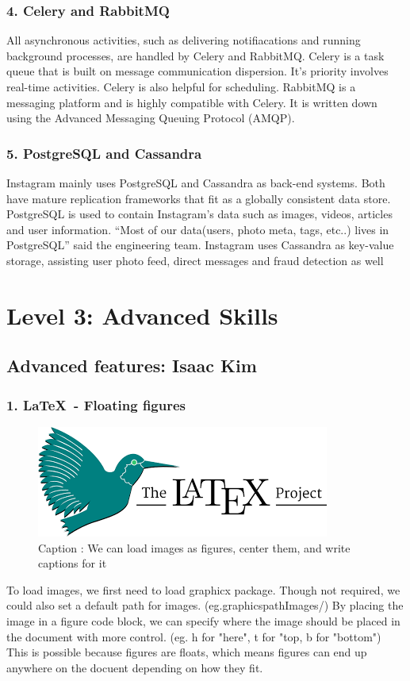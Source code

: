 \documentclass[a4paper, 11pt]{report}
\begin{document}
\subsubsection{4. Celery and RabbitMQ}
All asynchronous activities, such as delivering notifiacations and running background processes, are handled by Celery and RabbitMQ. Celery is a task queue that is built on message communication dispersion. It's priority involves real-time activities. Celery is also helpful for scheduling. RabbitMQ is a messaging platform and is highly compatible with Celery. It is written down using the Advanced Messaging Queuing Protocol (AMQP)\cite{ky4}.
\subsubsection{5. PostgreSQL and Cassandra}
Instagram mainly uses PostgreSQL and Cassandra as back-end systems. Both have mature replication frameworks that fit as a globally consistent data store\cite{ky5}. PostgreSQL is used to contain Instagram’s data such as images, videos, articles and user information\cite{ky4}. “Most of our data(users, photo meta, tags, etc..) lives in PostgreSQL” said the engineering team. Instagram uses Cassandra as key-value storage, assisting user photo feed, direct messages and fraud detection as well\cite{ky6}



\newpage
\section{Level 3: Advanced Skills}

\subsection{Advanced features: Isaac Kim}

\subsubsection{1. \LaTeX\ - Floating figures}
\begin{figure}[htp]
\centerline{\includegraphics{latexLogo.png}}
\caption{Caption : We can load images as figures, center them, and write captions for it}
\label{fig}
\end{figure}
To load images, we first need to load graphicx package. Though not required, we could also set a default path for images. (eg.graphicspath{{Images/}}) By placing the image in a figure code block, we can specify where the image should be placed in the document with more control. (eg. h for "here", t for "top, b for "bottom") This is possible because figures are floats, which means figures can end up anywhere on the docuent depending on how they fit. 
\end{document}
